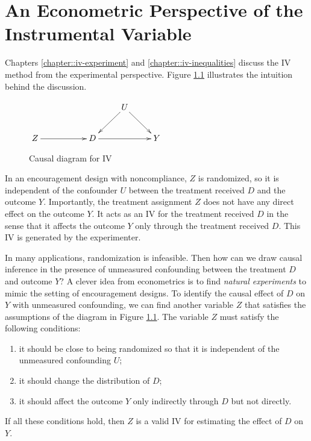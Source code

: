  
\chapter{An Econometric Perspective of the Instrumental Variable}
 \label{chapter::iv-econometric}
 
 
Chapters \ref{chapter::iv-experiment} and \ref{chapter::iv-inequalities} discuss the IV method from the experimental perspective. Figure \ref{fig::causal-diagram-IV} illustrates the intuition behind the discussion. 
 
 
\begin{figure}[h]
\centering 
$
\xymatrix{
 && & U  \ar[dl] \ar[dr] &\\
Z \ar[rr] &&D \ar[rr]&&Y
}
$
\caption{Causal diagram for IV}\label{fig::causal-diagram-IV}
\end{figure} 
 
 
 
In an encouragement design with noncompliance, $Z$ is randomized, so it is independent of the confounder $U$ between the treatment received $D$ and the outcome $Y$.  Importantly, the treatment assignment $Z$ does not have any direct effect on the outcome $Y$. It acts as an IV for the treatment received $D$ in the sense that it affects the outcome $Y$ only through the treatment received $D$. This IV is generated by the experimenter. 


In many applications, randomization is infeasible. Then how can we draw causal inference in the presence of unmeasured confounding between the treatment $D$ and outcome $Y$? A clever idea from econometrics is to find {\it natural experiments} to mimic the setting of encouragement designs. To identify the causal effect of $D$ on $Y$ with unmeasured confounding, we can find another variable $Z$ that satisfies the assumptions of the diagram in Figure \ref{fig::causal-diagram-IV}.  The variable $Z$ must satisfy the following conditions:
\begin{enumerate}
\item
it should be close to being randomized so that it is independent of the unmeasured confounding $U$;
\item
it should change the distribution of $D$;
\item
it should affect the outcome $Y$ only indirectly through $D$ but not directly.
\end{enumerate}
If all these conditions hold, then $Z$ is a valid IV for estimating the effect of $D$ on $Y$. 



